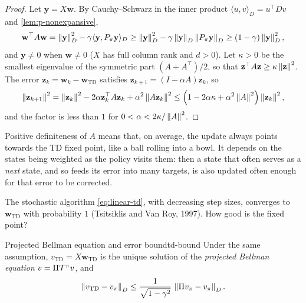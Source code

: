 \begin{proof}
  Let $\mathbf{y} = X \mathbf{w}$. By Cauchy--Schwarz in the inner product
  $\langle u, v \rangle_D = u^\top D v$ and \cref{lem:p-nonexpansive},
  \begin{equation*}
    \mathbf{w}^\top A \mathbf{w} = \left\lVert \mathbf{y} \right\rVert_D^2 - \gamma
    \langle \mathbf{y}, P_\pi \mathbf{y} \rangle_D
    \geq \left\lVert \mathbf{y} \right\rVert_D^2 - \gamma \left\lVert \mathbf{y} \right\rVert_D \left\lVert P_\pi
    \mathbf{y} \right\rVert_D \geq (1 - \gamma) \left\lVert \mathbf{y} \right\rVert_D^2,
  \end{equation*}
  and $\mathbf{y} \neq 0$ when $\mathbf{w} \neq 0$ ($X$ has full column
  rank and $d > 0$). Let $\kappa > 0$ be the smallest eigenvalue of the
  symmetric part $(A + A^\top)/2$, so that $\mathbf{z}^\top A \mathbf{z}
  \geq \kappa \left\lVert \mathbf{z} \right\rVert^2$. The error $\mathbf{z}_k = \mathbf{w}_k -
  \mathbf{w}_{\mathrm{TD}}$ satisfies $\mathbf{z}_{k+1} = (I - \alpha A)
  \mathbf{z}_k$, so
  \begin{equation*}
    \left\lVert \mathbf{z}_{k+1} \right\rVert^2 = \left\lVert \mathbf{z}_k \right\rVert^2 - 2 \alpha
    \mathbf{z}_k^\top A \mathbf{z}_k + \alpha^2 \left\lVert A \mathbf{z}_k \right\rVert^2
    \leq \left( 1 - 2 \alpha \kappa + \alpha^2 \left\lVert A \right\rVert^2 \right)
    \left\lVert \mathbf{z}_k \right\rVert^2,
  \end{equation*}
  and the factor is less than $1$ for $0 < \alpha < 2 \kappa /
  \left\lVert A \right\rVert^2$.
\end{proof}

\begin{intuition}
  Positive definiteness of $A$ means that, on average, the update always
  points towards the TD fixed point, like a ball rolling into a bowl. It
  depends on the states being weighted as the policy visits them: then a
  state that often serves as a \emph{next} state, and so feeds its error
  into many targets, is also updated often enough for that error to be
  corrected.
\end{intuition}

The stochastic algorithm \eqref{eq:linear-td}, with decreasing step sizes,
converges to $\mathbf{w}_{\mathrm{TD}}$ with probability $1$ (Tsitsiklis and
Van Roy, 1997). How good is the fixed point?

\begin{theorem}{Projected Bellman equation and error bound}{td-bound}
  Under the same assumption, $v_{\mathrm{TD}} = X \mathbf{w}_{\mathrm{TD}}$
  is the unique solution of the \emph{projected Bellman equation} $v = \Pi
  \mathcal{T}^\pi v$, and
  \begin{equation}
    \label{eq:td-bound}
    \left\lVert v_{\mathrm{TD}} - v_\pi \right\rVert_D \leq \frac{1}{\sqrt{1 - \gamma^2}}\,
    \left\lVert \Pi v_\pi - v_\pi \right\rVert_D.
  \end{equation}
\end{theorem}

